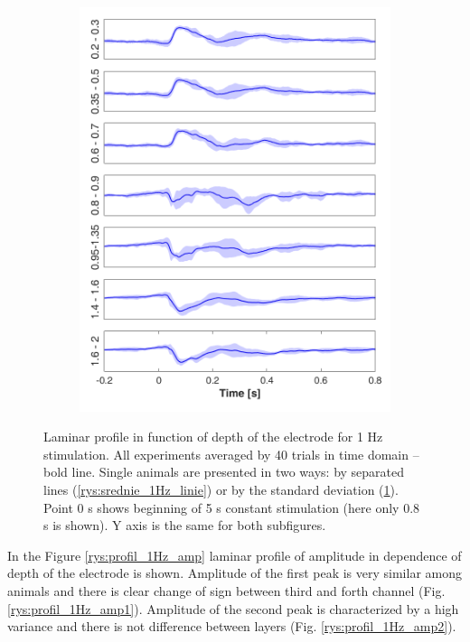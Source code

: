 \documentclass{pracalicmgr}
\begin{document}
\begin{figure}[H]
\begin{subfigure}{.5\textwidth}
		\includegraphics[width=1.\linewidth]{srednie_1Hz_std.png}
		\caption{}
		\label{rys:srednie_1Hz_std}
	\end{subfigure}

  \caption{Laminar profile in function of depth of the electrode for 1 Hz stimulation. All experiments averaged by 40 trials in time domain -- bold line. Single animals are presented in two ways: by separated lines (\ref{rys:srednie_1Hz_linie}) or by the standard deviation (\ref{rys:srednie_1Hz_std}). Point 0 s shows beginning of 5 s constant stimulation (here only 0.8 s is shown). Y axis is the same for both subfigures. }
  \label{rys:srednie_1Hz_1s}
\end{figure}

In the Figure \ref{rys:profil_1Hz_amp} laminar profile of amplitude in dependence of depth of the electrode is shown. Amplitude of the first peak is very similar among animals and there is clear change of sign between third and forth channel (Fig. \ref{rys:profil_1Hz_amp1}). Amplitude of the second peak is characterized by a high variance and there is not difference between layers (Fig. \ref{rys:profil_1Hz_amp2}).
  
\end{document}
